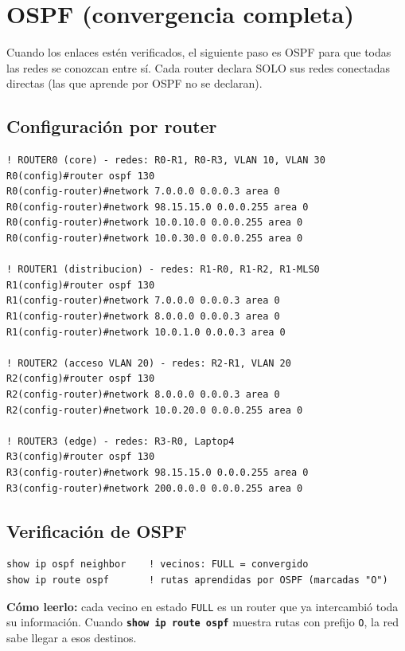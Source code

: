 \documentclass[11pt,a4paper]{report}
\newcommand{\cmd}[1]{\texttt{\textbf{#1}}}
\begin{document}
\chapter{OSPF (convergencia completa)}

Cuando los enlaces estén verificados, el siguiente paso es OSPF para que todas las redes se conozcan entre sí. Cada router declara SOLO sus redes conectadas directas (las que aprende por OSPF no se declaran).

\section{Configuración por router}

\begin{lstlisting}
! ROUTER0 (core) - redes: R0-R1, R0-R3, VLAN 10, VLAN 30
R0(config)#router ospf 130
R0(config-router)#network 7.0.0.0 0.0.0.3 area 0
R0(config-router)#network 98.15.15.0 0.0.0.255 area 0
R0(config-router)#network 10.0.10.0 0.0.0.255 area 0
R0(config-router)#network 10.0.30.0 0.0.0.255 area 0

! ROUTER1 (distribucion) - redes: R1-R0, R1-R2, R1-MLS0
R1(config)#router ospf 130
R1(config-router)#network 7.0.0.0 0.0.0.3 area 0
R1(config-router)#network 8.0.0.0 0.0.0.3 area 0
R1(config-router)#network 10.0.1.0 0.0.0.3 area 0

! ROUTER2 (acceso VLAN 20) - redes: R2-R1, VLAN 20
R2(config)#router ospf 130
R2(config-router)#network 8.0.0.0 0.0.0.3 area 0
R2(config-router)#network 10.0.20.0 0.0.0.255 area 0

! ROUTER3 (edge) - redes: R3-R0, Laptop4
R3(config)#router ospf 130
R3(config-router)#network 98.15.15.0 0.0.0.255 area 0
R3(config-router)#network 200.0.0.0 0.0.0.255 area 0
\end{lstlisting}

\section{Verificación de OSPF}

\begin{lstlisting}
show ip ospf neighbor    ! vecinos: FULL = convergido
show ip route ospf       ! rutas aprendidas por OSPF (marcadas "O")
\end{lstlisting}

\textbf{Cómo leerlo:} cada vecino en estado \texttt{FULL} es un router que ya intercambió toda su información. Cuando \cmd{show ip route ospf} muestra rutas con prefijo \texttt{O}, la red sabe llegar a esos destinos.
\end{document}
